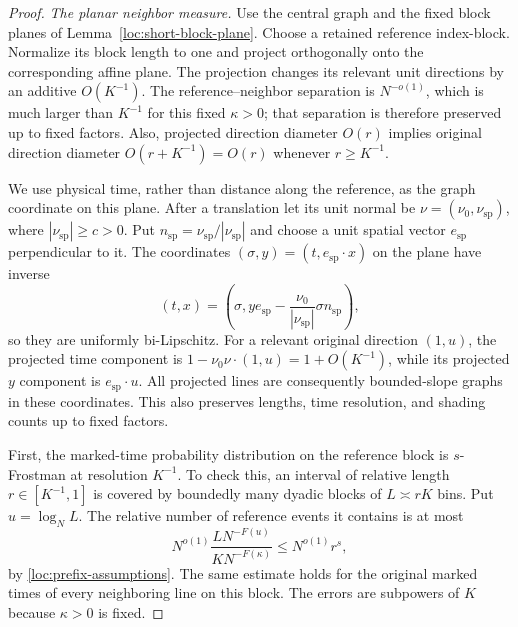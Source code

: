 \begin{proof}
\emph{The planar neighbor measure.}
Use the central graph and the fixed block planes of
Lemma~\ref{loc:short-block-plane}.  Choose a retained reference
index-block.  Normalize its block length to one and project
orthogonally onto the corresponding affine plane.  The projection
changes its relevant unit directions by an additive $O(K^{-1})$.
The reference--neighbor separation is $N^{-o(1)}$, which is much
larger than $K^{-1}$ for this fixed $\kappa>0$; that separation
is therefore preserved up to fixed factors.  Also, projected
direction diameter $O(r)$ implies original direction diameter
$O(r+K^{-1})=O(r)$ whenever $r\geq K^{-1}$.

We use physical time, rather than distance along the reference,
as the graph coordinate on this plane.  After a translation let
its unit normal be $\nu=(\nu_0,\nu_{\mathrm{sp}})$, where
$|\nu_{\mathrm{sp}}|\geq c>0$.  Put
$n_{\mathrm{sp}}=\nu_{\mathrm{sp}}/|\nu_{\mathrm{sp}}|$ and
choose a unit spatial vector $e_{\mathrm{sp}}$ perpendicular to it.
The coordinates $(\sigma,y)=(t,e_{\mathrm{sp}}\cdot x)$ on the
plane have inverse
\[
 (t,x)=\left(\sigma,
 y e_{\mathrm{sp}}-
 \frac{\nu_0}{|\nu_{\mathrm{sp}}|}\sigma n_{\mathrm{sp}}\right),
\]
so they are uniformly bi-Lipschitz.  For a relevant original
direction $(1,u)$, the projected time component is
$1-\nu_0\nu\cdot(1,u)=1+O(K^{-1})$, while its projected
$y$ component is $e_{\mathrm{sp}}\cdot u$.  All projected lines
are consequently bounded-slope graphs in these coordinates.
This also preserves lengths, time resolution, and shading counts
up to fixed factors.

First, the marked-time probability distribution on the reference
block is $s$-Frostman at resolution $K^{-1}$.  To check this, an
interval of relative length $r\in[K^{-1},1]$ is covered by boundedly
many dyadic blocks of $L\asymp rK$ bins.  Put $u=\log_N L$.
The relative number of reference events it contains is at most
\begin{equation}
 N^{o(1)}\frac{LN^{-F(u)}}{KN^{-F(\kappa)}}
 \leq N^{o(1)}r^s,
 \label{loc:time-frostman}
\end{equation}
by \eqref{loc:prefix-assumptions}.  The same estimate holds for
the original marked times of every neighboring line on this block.
The errors are subpowers of $K$ because $\kappa>0$ is fixed.


\end{proof}

